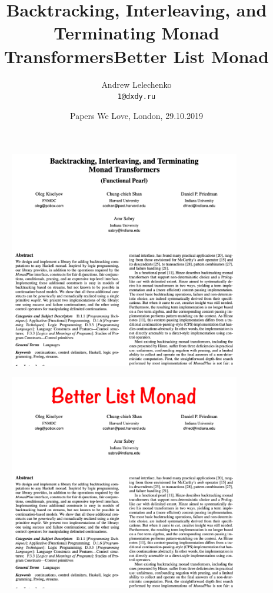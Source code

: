 \documentclass[handout]{beamer}
\title[Backtracking, Interleaving, and Terminating Monad\ldots]{Backtracking, Interleaving, and Terminating Monad Transformers}
\author[Andrew Lelechenko]{Andrew Lelechenko \\ \texttt{1@dxdy.ru}}
\institute[Barclays]{Barclays, London}
\date{Papers We Love, London, 29.10.2019}
\begin{document}
\begin{frame}
  \titlepage
\end{frame}


\begin{frame}
\begin{figure}[H]
\centering
\includegraphics[width=0.9\textwidth]{paper.png}
\end{figure}
\end{frame}

\title{Better List Monad}

\begin{frame}
\begin{figure}[H]
\centering
\includegraphics[width=0.9\textwidth]{better-list-monad.png}
\end{figure}
\end{frame}
\end{document}
